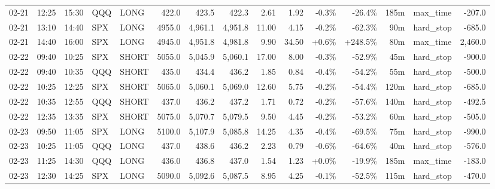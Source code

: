 \documentclass[11pt,a4paper,twoside]{article}
\begin{document}
\begin{landscape}
\begin{center}
\begin{longtable}{>{\color{txtmain}}l l l l l r r r r r r r r >{\color{txtmain}}l r}
02-21 & 12:25 & 15:30 & QQQ & LONG & 422.0 & 423.5 & 422.3 & 2.61 & 1.92 & \textcolor{lossred}{-0.3\%} & \textcolor{lossred}{-26.4\%} & 185m & max\_time & \textcolor{lossred}{-207.0} \\
02-21 & 13:10 & 14:40 & SPX & LONG & 4955.0 & 4,961.1 & 4,951.8 & 11.00 & 4.15 & \textcolor{lossred}{-0.2\%} & \textcolor{lossred}{-62.3\%} & 90m & hard\_stop & \textcolor{lossred}{-685.0} \\
02-21 & 14:40 & 16:00 & SPX & LONG & 4945.0 & 4,951.8 & 4,981.8 & 9.90 & 34.50 & \textcolor{wingreen}{+0.6\%} & \textcolor{wingreen}{+248.5\%} & 80m & max\_time & \textcolor{wingreen}{2,460.0} \\
02-22 & 09:40 & 10:25 & SPX & SHORT & 5055.0 & 5,045.9 & 5,060.1 & 17.00 & 8.00 & \textcolor{lossred}{-0.3\%} & \textcolor{lossred}{-52.9\%} & 45m & hard\_stop & \textcolor{lossred}{-900.0} \\
02-22 & 09:40 & 10:35 & QQQ & SHORT & 435.0 & 434.4 & 436.2 & 1.85 & 0.84 & \textcolor{lossred}{-0.4\%} & \textcolor{lossred}{-54.2\%} & 55m & hard\_stop & \textcolor{lossred}{-500.0} \\
02-22 & 10:25 & 12:25 & SPX & SHORT & 5065.0 & 5,060.1 & 5,069.0 & 12.60 & 5.75 & \textcolor{lossred}{-0.2\%} & \textcolor{lossred}{-54.4\%} & 120m & hard\_stop & \textcolor{lossred}{-685.0} \\
02-22 & 10:35 & 12:55 & QQQ & SHORT & 437.0 & 436.2 & 437.2 & 1.71 & 0.72 & \textcolor{lossred}{-0.2\%} & \textcolor{lossred}{-57.6\%} & 140m & hard\_stop & \textcolor{lossred}{-492.5} \\
02-22 & 12:35 & 13:35 & SPX & SHORT & 5075.0 & 5,070.7 & 5,079.5 & 9.50 & 4.45 & \textcolor{lossred}{-0.2\%} & \textcolor{lossred}{-53.2\%} & 60m & hard\_stop & \textcolor{lossred}{-505.0} \\
02-23 & 09:50 & 11:05 & SPX & LONG & 5100.0 & 5,107.9 & 5,085.8 & 14.25 & 4.35 & \textcolor{lossred}{-0.4\%} & \textcolor{lossred}{-69.5\%} & 75m & hard\_stop & \textcolor{lossred}{-990.0} \\
02-23 & 10:25 & 11:05 & QQQ & LONG & 437.0 & 438.6 & 436.2 & 2.23 & 0.79 & \textcolor{lossred}{-0.6\%} & \textcolor{lossred}{-64.6\%} & 40m & hard\_stop & \textcolor{lossred}{-576.0} \\
02-23 & 11:25 & 14:30 & QQQ & LONG & 436.0 & 436.8 & 437.0 & 1.54 & 1.23 & \textcolor{wingreen}{+0.0\%} & \textcolor{lossred}{-19.9\%} & 185m & max\_time & \textcolor{lossred}{-183.0} \\
02-23 & 12:30 & 14:25 & SPX & LONG & 5090.0 & 5,092.6 & 5,087.5 & 8.95 & 4.25 & \textcolor{lossred}{-0.1\%} & \textcolor{lossred}{-52.5\%} & 115m & hard\_stop & \textcolor{lossred}{-470.0} \\

\end{longtable}
\end{center}
\end{landscape}
\end{document}
